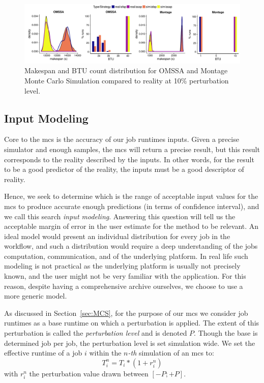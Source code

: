 \documentclass[10pt,conference,compsocconf]{IEEEtran}
\begin{document}
\begin{figure}
	\includegraphics[width=\textwidth]{gfx/fit_plot.pdf}
	\caption{Makespan and BTU count distribution for OMSSA and Montage Monte
	Carlo Simulation compared to reality at 10\% perturbation
	level.}\label{fig:fit}
\end{figure}



\subsection{Input Modeling}\label{sec:im}

Core  to the  \acl{mcs} is  the accuracy  of our  job runtimes  inputs. Given  a
precise simulator and enough samples, the \ac{mcs} will return a precise result,
but this  result corresponds to  the reality described  by the inputs.  In other
words, for the result to be a good  predictor of the reality, the inputs must be
a good descriptor of reality.

Hence, we seek  to determine which is  the range of acceptable  input values for
the  \ac{mcs} to  produce accurate  enough predictions  (in terms  of confidence
interval),  and we call this  search \emph{input  modeling}.  Answering  this
question will tell us the  acceptable margin of error in the  user estimate for the
method to be relevant.
An ideal  model would present  an individual distribution  for every job  in the
workflow, and such a distribution would require a deep understanding of the jobs
computation, communication, and  of the underlying platform.  In  real life such
modeling  is not  practical  as the  underlying platform  is  usually not
precisely  known, and  the user might not be very familiar with the application.
For this reason, despite having a comprehensive archive ourselves, we choose to 
use a more generic model.

As discussed in Section~\ref{sec:MCS}, for the purpose of our \ac{mcs} we
consider job runtimes as a base runtime on which a perturbation is applied. The
extent of this perturbation is called the \emph{perturbation level} and is
denoted $P$. Though the base is determined job per job, the perturbation level
is set simulation wide. We set the effective runtime of a job $i$ within the
$n$\textit{-th} simulation of an \ac{mcs} to: 
\begin{equation}
	T_i^n = T_i * (1+r_i^n)
\end{equation}
with $r_i^n$ the perturbation value drawn between $[-P;+P]$.
\end{document}
